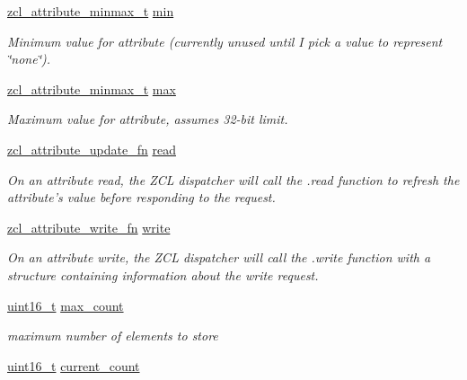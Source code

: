 \begin{DoxyCompactItemize}
\item 
\hyperlink{unionzcl__attribute__minmax__t}{zcl\-\_\-attribute\-\_\-minmax\-\_\-t} \hyperlink{group__zcl_gaad888af9d07cd3b611c75f15f8c90dfe}{min}
\begin{DoxyCompactList}\small\item\em Minimum value for attribute (currently unused until I pick a value to represent \char`\"{}none\char`\"{}). \end{DoxyCompactList}\item 
\hyperlink{unionzcl__attribute__minmax__t}{zcl\-\_\-attribute\-\_\-minmax\-\_\-t} \hyperlink{group__zcl_gae2490849003f8344782c06334b1e6b17}{max}
\begin{DoxyCompactList}\small\item\em Maximum value for attribute, assumes 32-\/bit limit. \end{DoxyCompactList}\item 
\hyperlink{group__zcl_ga9a022bce8add8364fde3ab5cc75354ef}{zcl\-\_\-attribute\-\_\-update\-\_\-fn} \hyperlink{group__zcl_ga80943597b8cce9d751a45efa823596ac}{read}
\begin{DoxyCompactList}\small\item\em On an attribute read, the Z\-C\-L dispatcher will call the .read function to refresh the attribute's value before responding to the request. \end{DoxyCompactList}\item 
\hyperlink{group__zcl_ga9024d6fb96d7fa35d13f7531efe3d6fb}{zcl\-\_\-attribute\-\_\-write\-\_\-fn} \hyperlink{group__zcl_gac8bd2f85f7df500d34b1d3cd27033a4e}{write}
\begin{DoxyCompactList}\small\item\em On an attribute write, the Z\-C\-L dispatcher will call the .write function with a structure containing information about the write request. \end{DoxyCompactList}\item 
\hypertarget{group__zcl_ga7b50573c335728800d65f3fb5479f9bc}{\hyperlink{group__hal_ga5a8b2dc9e45a9ee81a94ef304fb62505}{uint16\-\_\-t} \hyperlink{group__zcl_ga7b50573c335728800d65f3fb5479f9bc}{max\-\_\-count}}\label{group__zcl_ga7b50573c335728800d65f3fb5479f9bc}

\begin{DoxyCompactList}\small\item\em maximum number of elements to store \end{DoxyCompactList}\item 
\hypertarget{group__zcl_gaf83468db7e4fc12ef11ded6f62ffe7f8}{\hyperlink{group__hal_ga5a8b2dc9e45a9ee81a94ef304fb62505}{uint16\-\_\-t} \hyperlink{group__zcl_gaf83468db7e4fc12ef11ded6f62ffe7f8}{current\-\_\-count}}\label{group__zcl_gaf83468db7e4fc12ef11ded6f62ffe7f8}


\end{DoxyCompactItemize}

